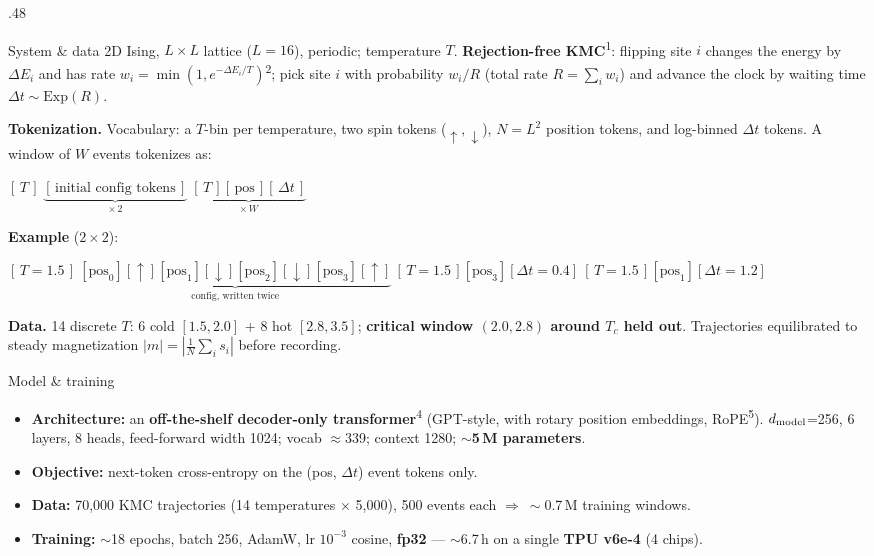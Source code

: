 \documentclass[final]{beamer}
\newcommand{\keypt}[1]{\textcolor{oabrown}{\textbf{#1}}}
\newcommand{\refcite}[1]{\textsuperscript{\textcolor{oablue}{#1}}}
\let\origtextbf\textbf
\renewcommand{\textbf}[1]{\textcolor{oabrown}{\origtextbf{#1}}}
\begin{document}
\begin{frame}[t]
\begin{columns}[t]
\begin{column}{.48\paperwidth}
  \begin{block}{System \& data}
    2D Ising, $L{\times}L$ lattice ($L{=}16$), periodic; temperature $T$.
    \textbf{Rejection-free KMC}\refcite{1}: flipping site $i$ changes the energy by $\Delta E_i$ and has rate
    $w_i=\min(1,e^{-\Delta E_i/T})$\refcite{2}; pick site $i$ with probability $w_i/R$ (total rate $R=\sum_i w_i$)
    and advance the clock by waiting time $\Delta t\sim\mathrm{Exp}(R)$.

    \medskip
    \textbf{Tokenization.} Vocabulary: a $T$-bin per temperature, two spin tokens
    ($\uparrow,\downarrow$), $N{=}L^2$ position tokens, and log-binned $\Delta t$ tokens. A window of $W$
    events tokenizes as:
    \par\smallskip
    {\centering$[\,T\,]\;\underbrace{[\,\text{initial config tokens}\,]}_{\times\,2}\;\underbrace{[\,T\,][\,\mathrm{pos}\,][\,\Delta t\,]}_{\times\,W}$\par}\smallskip
    \textbf{Example} ($2{\times}2$):
    \par\smallskip
    {\centering$[\,T{=}1.5\,]\ \underbrace{[\mathrm{pos}_0][{\uparrow}][\mathrm{pos}_1][{\downarrow}][\mathrm{pos}_2][{\downarrow}][\mathrm{pos}_3][{\uparrow}]}_{\text{config, written twice}}\ [\,T{=}1.5\,][\mathrm{pos}_3][\Delta t{=}0.4]\ [\,T{=}1.5\,][\mathrm{pos}_1][\Delta t{=}1.2]$\par}\smallskip

    \medskip
    \textbf{Data.} 14 discrete $T$: 6 cold $[1.5,2.0]$ + 8 hot $[2.8,3.5]$; \keypt{critical window
    $(2.0,2.8)$ around $T_c$ held out}. Trajectories equilibrated to steady magnetization $|m|=|\tfrac{1}{N}\sum_i s_i|$ before recording.
  \end{block}

  \begin{block}{Model \& training}
    \begin{itemize}
      \item \textbf{Architecture:} an \keypt{off-the-shelf decoder-only transformer}\refcite{4} (GPT-style,
            with rotary position embeddings, RoPE\refcite{5}). $d_{\rm model}$=256,
            6 layers, 8 heads, feed-forward width 1024; vocab $\approx$339; context 1280;
            \keypt{$\sim$5\,M parameters}.
      \item \textbf{Objective:} next-token cross-entropy on the (pos, $\Delta t$) event tokens only.
      \item \textbf{Data:} 70{,}000 KMC trajectories (14 temperatures $\times$ 5{,}000), 500 events each
            $\Rightarrow\ \sim$0.7\,M training windows.
      \item \textbf{Training:} $\sim$18 epochs, batch 256, AdamW, lr $10^{-3}$ cosine,
            \keypt{fp32} --- $\sim$6.7\,h on a single \keypt{TPU v6e-4} (4 chips).
    \end{itemize}
  \end{block}


\end{column}
\end{columns}
\end{frame}
\end{document}
